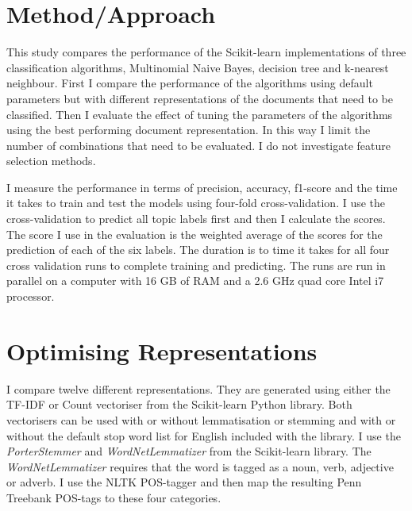 \documentclass[11pt]{article}
\begin{document}
\section{Method/Approach}

This study compares the performance of the Scikit-learn implementations of three classification algorithms, Multinomial Naive Bayes, decision tree and k-nearest neighbour. First I compare the performance of the algorithms using default parameters but with different representations of the documents that need to be classified. Then I evaluate the effect of tuning the parameters of the algorithms using the best performing document representation. In this way I limit the number of combinations that need to be evaluated. I do not investigate feature selection methods.

I measure the performance in terms of precision, accuracy, f1-score and the time it takes to train and test the models using four-fold cross-validation. I use the cross-validation to predict all topic labels first and then I calculate the scores. The score I use in the evaluation is the weighted average of the scores for the prediction of each of the six labels. The duration is to time it takes for all four cross validation runs to complete training and predicting. The runs are run in parallel on a computer with 16 GB of RAM and a 2.6 GHz quad core Intel i7 processor.

\section{Optimising Representations}

I compare twelve different representations. They are generated using either the TF-IDF or Count vectoriser from the Scikit-learn Python library. Both vectorisers can be used with or without lemmatisation or stemming and with or without the default stop word list for English included with the library. I use the \emph{PorterStemmer} and \emph{WordNetLemmatizer} from the Scikit-learn library. The \emph{WordNetLemmatizer} requires that the word is tagged as a noun, verb, adjective or adverb. I use the NLTK POS-tagger and then map the resulting Penn Treebank POS-tags to these four categories.
\end{document}
